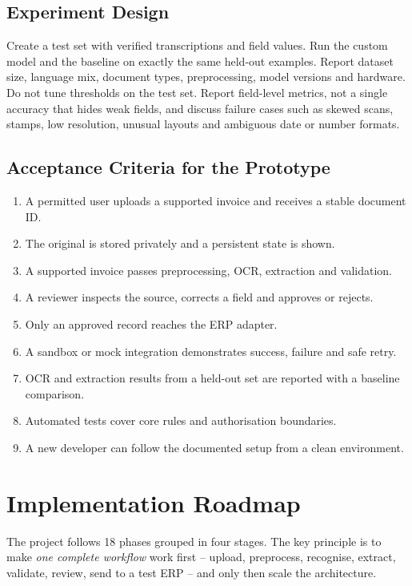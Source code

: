 \section{Experiment Design}
Create a test set with verified transcriptions and field values. Run the custom model and the baseline on exactly the same held-out examples. Report dataset size, language mix, document types, preprocessing, model versions and hardware. Do not tune thresholds on the test set. Report field-level metrics, not a single accuracy that hides weak fields, and discuss failure cases such as skewed scans, stamps, low resolution, unusual layouts and ambiguous date or number formats.

\section{Acceptance Criteria for the Prototype}
\begin{enumerate}
\item A permitted user uploads a supported invoice and receives a stable document ID.
\item The original is stored privately and a persistent state is shown.
\item A supported invoice passes preprocessing, OCR, extraction and validation.
\item A reviewer inspects the source, corrects a field and approves or rejects.
\item Only an approved record reaches the ERP adapter.
\item A sandbox or mock integration demonstrates success, failure and safe retry.
\item OCR and extraction results from a held-out set are reported with a baseline comparison.
\item Automated tests cover core rules and authorisation boundaries.
\item A new developer can follow the documented setup from a clean environment.
\end{enumerate}

\chapter{Implementation Roadmap}
The project follows 18 phases grouped in four stages. The key principle is to make \emph{one complete workflow} work first -- upload, preprocess, recognise, extract, validate, review, send to a test ERP -- and only then scale the architecture.

